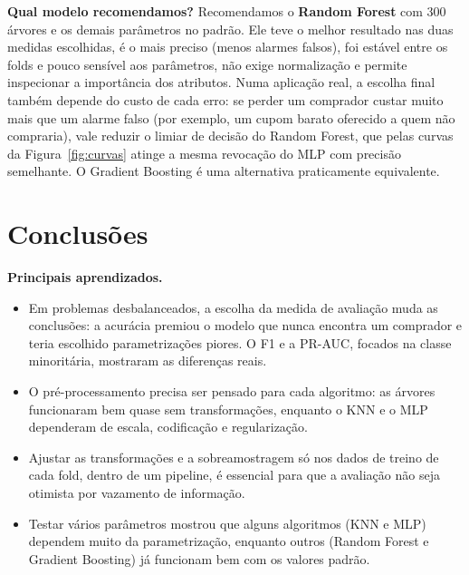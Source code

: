 \documentclass[11pt,a4paper]{article}
\begin{document}
\textbf{Qual modelo recomendamos?} Recomendamos o \textbf{Random Forest} com 300 árvores e os demais parâmetros no
padrão. Ele teve o melhor resultado nas duas medidas escolhidas, é o mais preciso (menos alarmes falsos), foi estável
entre os folds e pouco sensível aos parâmetros, não exige normalização e permite inspecionar a importância dos
atributos. Numa aplicação real, a escolha final também depende do custo de cada erro: se perder um comprador custar
muito mais que um alarme falso (por exemplo, um cupom barato oferecido a quem não compraria), vale reduzir o limiar de
decisão do Random Forest, que pelas curvas da Figura~\ref{fig:curvas} atinge a mesma revocação do MLP com precisão
semelhante. O Gradient Boosting é uma alternativa praticamente equivalente.

\section{Conclusões}

\textbf{Principais aprendizados.}
\begin{itemize}
  \item Em problemas desbalanceados, a escolha da medida de avaliação muda as conclusões: a acurácia premiou o modelo
        que nunca encontra um comprador e teria escolhido parametrizações piores. O F1 e a PR-AUC, focados na classe
        minoritária, mostraram as diferenças reais.
  \item O pré-processamento precisa ser pensado para cada algoritmo: as árvores funcionaram bem quase sem
        transformações, enquanto o KNN e o MLP dependeram de escala, codificação e regularização.
  \item Ajustar as transformações e a sobreamostragem só nos dados de treino de cada fold, dentro de um pipeline, é
        essencial para que a avaliação não seja otimista por vazamento de informação.
  \item Testar vários parâmetros mostrou que alguns algoritmos (KNN e MLP) dependem muito da parametrização, enquanto
        outros (Random Forest e Gradient Boosting) já funcionam bem com os valores padrão.
\end{itemize}
\end{document}
